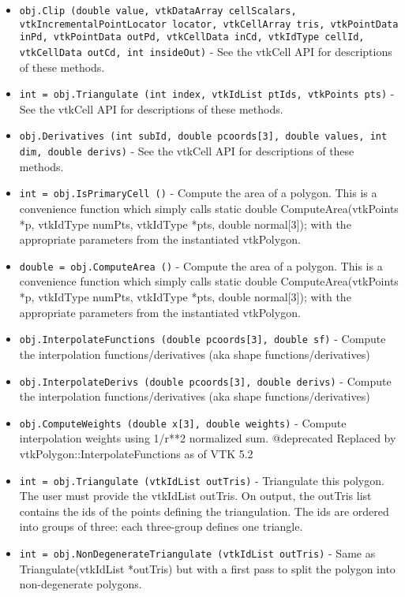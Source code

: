 \begin{itemize}
\item  \verb|obj.Clip (double value, vtkDataArray cellScalars, vtkIncrementalPointLocator locator, vtkCellArray tris, vtkPointData inPd, vtkPointData outPd, vtkCellData inCd, vtkIdType cellId, vtkCellData outCd, int insideOut)| -  See the vtkCell API for descriptions of these methods.

\item  \verb|int = obj.Triangulate (int index, vtkIdList ptIds, vtkPoints pts)| -  See the vtkCell API for descriptions of these methods.

\item  \verb|obj.Derivatives (int subId, double pcoords[3], double values, int dim, double derivs)| -  See the vtkCell API for descriptions of these methods.

\item  \verb|int = obj.IsPrimaryCell ()| -  Compute the area of a polygon. This is a convenience function
 which simply calls static double ComputeArea(vtkPoints *p, 
 vtkIdType numPts, vtkIdType *pts, double normal[3]);
 with the appropriate parameters from the instantiated vtkPolygon.

\item  \verb|double = obj.ComputeArea ()| -  Compute the area of a polygon. This is a convenience function
 which simply calls static double ComputeArea(vtkPoints *p, 
 vtkIdType numPts, vtkIdType *pts, double normal[3]);
 with the appropriate parameters from the instantiated vtkPolygon.

\item  \verb|obj.InterpolateFunctions (double pcoords[3], double sf)| -  Compute the interpolation functions/derivatives
 (aka shape functions/derivatives)

\item  \verb|obj.InterpolateDerivs (double pcoords[3], double derivs)| -  Compute the interpolation functions/derivatives
 (aka shape functions/derivatives)

\item  \verb|obj.ComputeWeights (double x[3], double weights)| -  Compute interpolation weights using 1/r**2 normalized sum.
 @deprecated Replaced by vtkPolygon::InterpolateFunctions as of VTK 5.2

\item  \verb|int = obj.Triangulate (vtkIdList outTris)| -  Triangulate this polygon. The user must provide the vtkIdList outTris.
 On output, the outTris list contains the ids of the points defining
 the triangulation. The ids are ordered into groups of three: each
 three-group defines one triangle.

\item  \verb|int = obj.NonDegenerateTriangulate (vtkIdList outTris)| -  Same as Triangulate(vtkIdList *outTris)
 but with a first pass to split the polygon into non-degenerate polygons.

\end{itemize}
